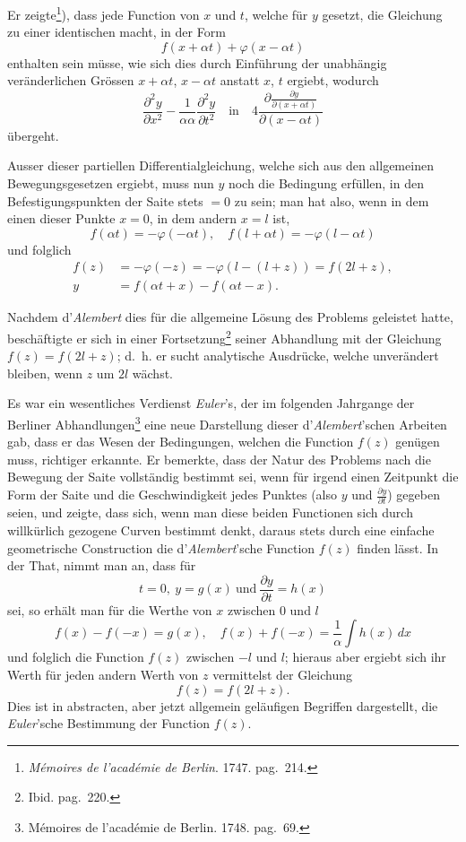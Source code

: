 \documentclass[12pt,a4paper]{article}
\begin{document}
Er zeigte\footnote{\textit{Mémoires de l'académie de Berlin}. 1747. pag.~214.}), dass jede Function von $x$ und $t$, welche für $y$ gesetzt, die Gleichung zu einer identischen macht, in der Form
\[ f(x + \alpha t) + \varphi(x - \alpha t) \]
enthalten sein müsse, wie sich dies durch Einführung der unabhängig veränderlichen Grössen $x + \alpha t$, $x - \alpha t$ anstatt $x$, $t$ ergiebt, wodurch
\[ \frac{\partial^2 y}{\partial x^2} - \frac{1}{\alpha\alpha}\frac{\partial^2 y}{\partial t^2} \quad\text{in}\quad 4\frac{\partial\frac{\partial y}{\partial(x+\alpha t)}}{\partial(x-\alpha t)} \]
übergeht.

Ausser dieser partiellen Differentialgleichung, welche sich aus den allgemeinen Bewegungsgesetzen ergiebt, muss nun $y$ noch die Bedingung erfüllen, in den Befestigungspunkten der Saite stets $= 0$ zu sein; man hat also, wenn in dem einen dieser Punkte $x = 0$, in dem andern $x = l$ ist,
\[ f(\alpha t) = -\varphi(-\alpha t),\quad f(l + \alpha t) = -\varphi(l - \alpha t) \]
und folglich
\begin{align*}
f(z) &= -\varphi(-z) = -\varphi(l - (l+z)) = f(2l + z),\\
y &= f(\alpha t + x) - f(\alpha t - x).
\end{align*}

Nachdem d'\textit{Alembert} dies für die allgemeine Lösung des Problems geleistet hatte, beschäftigte er sich in einer Fortsetzung\footnote{Ibid. pag.~220.} seiner Abhandlung mit der Gleichung $f(z) = f(2l+z)$; d.~h. er sucht analytische Ausdrücke, welche unverändert bleiben, wenn $z$ um $2l$ wächst.

Es war ein wesentliches Verdienst \textit{Euler}'s, der im folgenden Jahrgange der Berliner Abhandlungen\footnote{Mémoires de l'académie de Berlin. 1748. pag.~69.} eine neue Darstellung dieser d'\textit{Alembert}'schen Arbeiten gab, dass er das Wesen der Bedingungen, welchen die Function $f(z)$ genügen muss, richtiger erkannte. Er bemerkte, dass der Natur des Problems nach die Bewegung der Saite vollständig bestimmt sei, wenn für irgend einen Zeitpunkt die Form der Saite und die Geschwindigkeit jedes Punktes (also $y$ und $\frac{\partial y}{\partial t}$) gegeben seien, und zeigte, dass sich, wenn man diese beiden Functionen sich durch willkürlich gezogene Curven bestimmt denkt, daraus stets durch eine einfache geometrische Construction die d'\textit{Alembert}'sche Function $f(z)$ finden lässt. In der That, nimmt man an, dass für
\[ t = 0,\ y = g(x)\ \text{und}\ \frac{\partial y}{\partial t} = h(x) \]
sei, so erhält man für die Werthe von $x$ zwischen $0$ und $l$
\[ f(x) - f(-x) = g(x),\quad f(x) + f(-x) = \frac{1}{\alpha}\int h(x)\,dx \]
und folglich die Function $f(z)$ zwischen $-l$ und $l$; hieraus aber ergiebt sich ihr Werth für jeden andern Werth von $z$ vermittelst der Gleichung
\[ f(z) = f(2l + z). \]
Dies ist in abstracten, aber jetzt allgemein geläufigen Begriffen dargestellt, die \textit{Euler}'sche Bestimmung der Function $f(z)$.
\end{document}
